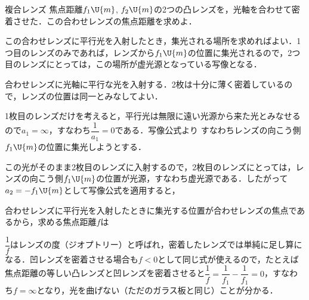 \bsNeed{40mm}
\begin{reidaiunit}
\begin{reidai}{複合レンズ}
\hspace{1zw}焦点距離$f_1\U{m}$, $f_2\U{m}$の2つの凸レンズを，光軸を合わせて密着させた．この合わせレンズの焦点距離を求めよ．
\end{reidai}

\begin{sisinE}
この合わせレンズに平行光を入射したとき，集光される場所を求めればよい．1つ目のレンズのみであれば，レンズから$f_1\U{m}$の位置に集光されるので，2つ目のレンズにとっては，{\gtfamily この場所が虚光源となっている写像}となる．
\end{sisinE}


\begin{kaitou}
\hspace{1zw}合わせレンズに光軸に平行な光を入射する．2枚は十分に薄く密着しているので，レンズの位置は同一とみなしてよい．

\hspace{1zw}1枚目のレンズだけを考えると，平行光は無限に遠い光源から来た光とみなせるので$a_1=\infty$，すなわち$\dfrac{1}{a_1}=0$である．写像公式より
すなわちレンズの向こう側$f_1\U{m}$の位置に集光しようとする．

\hspace{1zw}この光がそのまま2枚目のレンズに入射するので，2枚目のレンズにとっては，レンズの向こう側$f_1\U{m}$の位置が光源，すなわち{\gtfamily 虚光源}である．したがって$a_2=-f_1\U{m}$として写像公式を適用すると，

\hspace{1zw}合わせレンズに平行光を入射したときに集光する位置が合わせレンズの焦点であるから，求める焦点距離$f$は
\end{kaitou}

\begin{chuu}
$\dfrac{1}{f}$は{\gtfamily レンズの度}（ジオプトリー）と呼ばれ，密着したレンズでは単純に足し算になる．凹レンズを密着させる場合も$f<0$として同じ式が使えるので，たとえば焦点距離の等しい凸レンズと凹レンズを密着させると$\dfrac{1}{f}=\dfrac{1}{f_1}-\dfrac{1}{f_1}=0$，すなわち$f=\infty$となり，光を曲げない（ただのガラス板と同じ）ことが分かる．
\end{chuu}
\end{reidaiunit}

